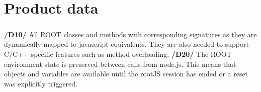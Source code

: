 \chapter{Product data}

\paragraph{}
\textbf{/D10/}
All ROOT classes and methods with corresponding signatures as they are dynamically mapped to javascript equivalents. They are also needed to support C/C++ specific features such as method overloading.
\textbf{/D20/}
The ROOT environment state is preserved between calls from node.js. This means that objects and variables are available until the rootJS session has ended or a reset was explicitly triggered.
